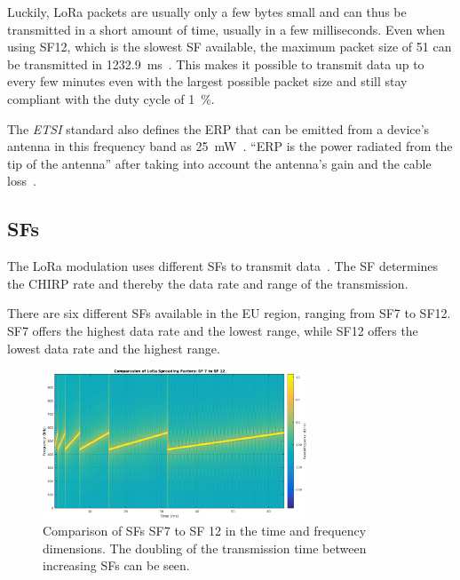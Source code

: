 Luckily, LoRa packets are usually only a few bytes small and can thus be transmitted in a short amount of time, usually in a few milliseconds.
Even when using \acs{SF}12, which is the slowest \acs{SF} available, the maximum packet size of \SI{51}{\byte} can be transmitted in  \SI{1232.9}{\milli\second}~\cite[p. 6]{the_things_network_lorawan_nodate}\cite[p. 10f]{lora_alliance_inc_lorawan_regional_2017}.
This makes it possible to transmit data up to every few minutes even with the largest possible packet size and still stay compliant with the duty cycle of \SI{1}{\percent}.

The \emph{ETSI} standard also defines the \acf{ERP} that can be emitted from a device's antenna in this frequency band as \SI{25}{\milli\watt}~\cite[p. 29]{etsi_etsi_2012}.
``\ac{ERP} is the power radiated from the tip of the antenna'' after taking into account the antenna's gain and the cable loss~\cite[p. 23]{faruque_radio_2015}.

\subsection{\acfp{SF}}\label{sec:spreading-factors}

The \ac{LoRa} modulation uses different \aclp{SF} to transmit data~\cite{the_things_network_spreading_2023}.
The \acl{SF} determines the \ac{CHIRP} rate and thereby the data rate and range of the transmission.

There are six different \aclp{SF} available in the \ac{EU} region, ranging from \ac{SF}7 to \ac{SF}12.
\ac{SF}7 offers the highest data rate and the lowest range, while \ac{SF}12 offers the lowest data rate and the highest range.

\begin{figure}[htbp]
    \centering
    \includegraphics[width=0.7\textwidth]{pictures/lora/SF_Comparison_7_12.png}
    \caption{
        Comparison of \aclp{SF} \ac{SF}7 to \ac{SF} 12 in the time and frequency dimensions.
        The doubling of the transmission time between increasing \aclp{SF} can be seen.\protect\cite{sakshama_ghoslya_lora_2017}
    }\label{pic:lora-sf-comparison}
\end{figure}

